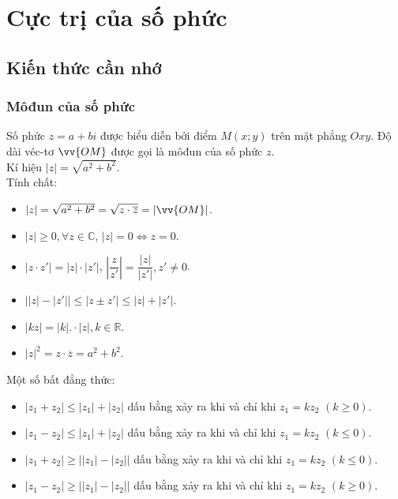 \setcounter{section}{41}
\setcounter{ex}{0}
\section{Cực trị của số phức}
\subsection{Kiến thức cần nhớ}
\begin{khung}
	\subsubsection{Môđun của số phức}
	Số phức $ z=a+bi $ được biểu diễn bởi điểm $ M(x;y) $ trên mặt phẳng $ Oxy $. Độ dài véc-tơ $ \vv{OM} $ được gọi là môđun của số phức $ z $.\\
	Kí hiệu $ |z|=\sqrt{a^2+b^2} $.\\
	Tính chất:
	\begin{itemize}
		\item $ |z|=\sqrt{a^2+b^2}=\sqrt{z\cdot \overline{z}}=|\vv{OM}| $.
		\item $ |z|\ge 0,\forall z\in\mathbb{C} $, $ |z|=0\Leftrightarrow z=0 $.
		\item $ |z\cdot z'|=|z|\cdot |z'| $, $ \left|\dfrac{z}{z'}\right|=\dfrac{|z|}{|z'|}, z'\ne 0 $.
		\item $ \left||z|-|z'|\right|\le |z\pm z'|\le |z|+|z'| $.
		\item $ |kz|=|k|.\cdot|z|, k\in\mathbb{R} $.
		\item $ |z|^2=z\cdot \overline{z}=a^2+b^2 $.
	\end{itemize}
	Một số bất đẳng thức:
	\begin{itemize}
		\item $ |z_1+z_2|\le |z_1|+|z_2| $ dấu bằng xảy ra khi và chỉ khi $ z_1=kz_2 $ $ (k\ge 0) $.
		\item $ |z_1-z_2|\le |z_1|+|z_2| $ dấu bằng xảy ra khi và chỉ khi $ z_1=kz_2 $ $ (k\le 0) $.
		\item $ |z_1+z_2|\ge \left||z_1|-|z_2|\right| $ dấu bằng xảy ra khi và chỉ khi $ z_1=kz_2 $ $ (k\le 0) $.
		\item $ |z_1-z_2|\ge \left||z_1|-|z_2|\right| $ dấu bằng xảy ra khi và chỉ khi $ z_1=kz_2 $ $ (k\ge 0) $.
	\end{itemize}
	
\end{khung}
